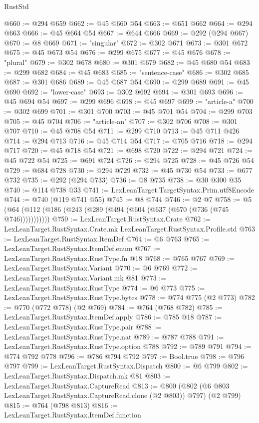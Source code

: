 \begin{lexlean}{RustStd}
\begin{coremodule}
@660 := @294 @659
@662 := @45 @660 @54
@663 := @651 @662
@664 := @294 @663
@666 := @45 @664 @54
@667 := @644 @666
@669 := @292 (@294 @667)
@670 := @8 @669
@671 := "singular"
@672 := @302 @671
@673 := @301 @672
@675 := @45 @673 @54
@676 := @299 @675
@677 := @45 @676
@678 := "plural"
@679 := @302 @678
@680 := @301 @679
@682 := @45 @680 @54
@683 := @299 @682
@684 := @45 @683
@685 := "sentence-case"
@686 := @302 @685
@687 := @301 @686
@689 := @45 @687 @54
@690 := @299 @689
@691 := @45 @690
@692 := "lower-case"
@693 := @302 @692
@694 := @301 @693
@696 := @45 @694 @54
@697 := @299 @696
@698 := @45 @697
@699 := "article-a"
@700 := @302 @699
@701 := @301 @700
@703 := @45 @701 @54
@704 := @299 @703
@705 := @45 @704
@706 := "article-an"
@707 := @302 @706
@708 := @301 @707
@710 := @45 @708 @54
@711 := @299 @710
@713 := @45 @711 @426
@714 := @294 @713
@716 := @45 @714 @54
@717 := @705 @716
@718 := @294 @717
@720 := @45 @718 @54
@721 := @698 @720
@722 := @294 @721
@724 := @45 @722 @54
@725 := @691 @724
@726 := @294 @725
@728 := @45 @726 @54
@729 := @684 @728
@730 := @294 @729
@732 := @45 @730 @54
@733 := @677 @732
@735 := @292 (@294 @733)
@736 := @8 @735
@738 := @30 @300 @35
@740 := @114 @738 @33
@741 := LexLeanTarget.TargetSyntax.Prim.utf8Encode
@744 := @740 (@119 @741 @55)
@745 := @8 @744
@746 := @2 @7
@758 := @5 (@64 (@112 (@186 (@243 (@289 (@494 (@604 (@637 (@670 (@736 (@745 @746)))))))))))
@759 := LexLeanTarget.RustSyntax.Crate
@762 := LexLeanTarget.RustSyntax.Crate.mk LexLeanTarget.RustSyntax.Profile.std
@763 := LexLeanTarget.RustSyntax.ItemDef
@764 := @6 @763
@765 := LexLeanTarget.RustSyntax.ItemDef.enum
@767 := LexLeanTarget.RustSyntax.RustType.fn @18
@768 := @765 @767
@769 := LexLeanTarget.RustSyntax.Variant
@770 := @6 @769
@772 := LexLeanTarget.RustSyntax.Variant.mk @81
@773 := LexLeanTarget.RustSyntax.RustType
@774 := @6 @773
@775 := LexLeanTarget.RustSyntax.RustType.bytes
@778 := @774 @775 (@2 @773)
@782 := @770 (@772 @778) (@2 @769)
@784 := @764 (@768 @782)
@785 := LexLeanTarget.RustSyntax.ItemDef.apply
@786 := @785 @18
@787 := LexLeanTarget.RustSyntax.RustType.pair
@788 := LexLeanTarget.RustSyntax.RustType.nat
@789 := @787 @788
@791 := LexLeanTarget.RustSyntax.RustType.option @788
@792 := @789 @791
@794 := @774 @792 @778
@796 := @786 @794 @792
@797 := Bool.true
@798 := @796 @797
@799 := LexLeanTarget.RustSyntax.Dispatch
@800 := @6 @799
@802 := LexLeanTarget.RustSyntax.Dispatch.mk @81
@803 := LexLeanTarget.RustSyntax.CaptureRead
@813 := @800 (@802 (@6 @803 LexLeanTarget.RustSyntax.CaptureRead.clone (@2 @803)) @797) (@2 @799)
@815 := @764 (@798 @813)
@816 := LexLeanTarget.RustSyntax.ItemDef.function

\end{coremodule}
\end{lexlean}

